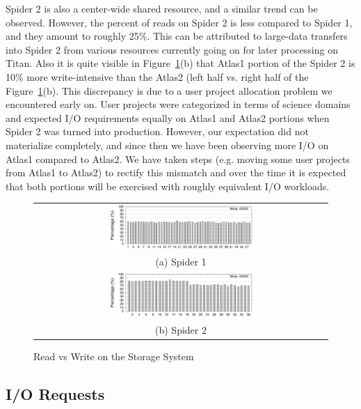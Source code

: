 Spider 2 is also a center-wide shared resource, and a similar trend can be
observed. However, the percent of reads on Spider 2 is less compared to Spider
1, and they amount to roughly 25\%. This can be attributed to large-data
transfers into Spider 2 from various resources currently going on for later
processing on Titan. Also it is quite visible in Figure~\ref{fig:rwratio}(b)
that Atlas1 portion of the Spider 2 is 10\% more write-intensive than the
Atlas2 (left half vs. right half of the Figure~\ref{fig:rwratio}(b). This
discrepancy is due to a user project allocation problem we encountered early
on. User projects were categorized in terms of science domains and expected I/O
requirements equally on Atlas1 and Atlas2 portions when Spider 2 was turned
into production. However, our expectation did not materialize completely, and
since then we have been observing more I/O on Atlas1 compared to Atlas2. We
have taken steps (e.g. moving some user projects from Atlas1 to Atlas2) to
rectify this mismatch and over the time it is expected that both portions will
be exercised with roughly equivalent I/O workloads. 

\begin{figure}[!t]
\begin{center}
\begin{tabular}{c}
{\includegraphics[width=0.5\textwidth]{./figs/spider1-wr-ratio.eps}}\\
{(a) Spider 1}\\
{\includegraphics[width=0.5\textwidth]{./figs/spider2-wr-ratio.eps}}\\
{(b) Spider 2}\\
\end{tabular}
\vspace{-0.1in}
\caption{Read vs Write on the Storage System}
\label{fig:rwratio}
\end{center}
\end{figure}


\subsection{I/O Requests}
